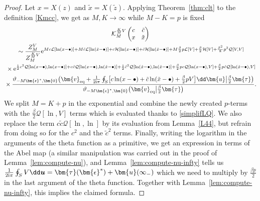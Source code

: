 \documentclass[pdftex]{sigma}
\numberwithin{equation}{section}
\begin{document}
\begin{proof}
Let $x = X(z)$ and $\tilde{x} = X(\tilde{z})$. Applying
 Theorem~\ref{thm:clt} to the definition \eqref{Kmcc}, we get as $M,K \rightarrow \infty$ while $ M - K = p$ is fixed
 \begin{gather*}
	 \mathcal{K}^{\frac{K}{M}V}_{M}\left(\begin{matrix} c & \tilde{c} \\ x & \tilde{x} \end{matrix}\right) \\
{} \sim \frac{Z^{V}_{M}}{Z^{\frac{K}{M}V}_{M}}{\rm e}^{Mc\mathcal{L}[\ln(x - \bullet)] + M\tilde{c}\mathcal{L}[\ln(\tilde{x} - \bullet)] + c\mathcal{H}[\ln(x - \bullet)] + \tilde{c}\mathcal{H}[\ln(\tilde{x} - \bullet)] + M\frac{\beta}{2}p\mathcal{L}[V] + \frac{\beta}{2}\mathcal{H}[V] + \frac{\beta^2}{8}p^2\mathcal{Q}[V,V]} \\
 {}\times{\rm e}^{ \frac{1}{2}c^2 \mathcal{Q}[\ln(x - \bullet),\ln(x - \bullet)] + c \tilde{c} \mathcal{Q}[\ln(x - \bullet),\ln(\tilde{x} - \bullet)] + \frac{1}{2}\tilde{c}^2\mathcal{Q}[\ln(\tilde{x} - \bullet),\ln(\tilde{x} - \bullet)]+\frac{\beta}{2}pc \mathcal{Q}[\ln(x - \bullet),V] + \frac{\beta}{2}p\tilde{c}\mathcal{Q}[\ln(\tilde{x} - \bullet),V]}\! \\
 {}\times \frac{\vartheta_{-M\bm{\epsilon}^{*}, \bm{0}}\bigl(\bm{v}_{{\rm eq}} + \frac{1}{2{\rm i}\pi} \oint_{S}\bigl[c\ln(x - \bullet) + \tilde{c}\ln(\tilde{x} - \bullet) + \frac{\beta}{2}p V\bigr] \dd \bm{u} \big| \frac{\beta}{2}\bm{\tau}\bigr)}{\vartheta_{-M\bm{\epsilon}^{*},\bm{0}}\bigl(\bm{v}_{{\rm eq}}\big|\frac{\beta}{2}\bm{\tau}\bigr)}.
\end{gather*}
We split $M = K + p$ in the exponential and combine the newly created
$p$-terms with the $\frac{\beta}{2}\mathcal{Q}[\ln,V]$ terms which is
evaluated thanks to \eqref{simplifLQ}. We also replace the term
$c\tilde{c}\mathcal{Q}[\ln,\ln]$ by its evaluation from
Lemma~\ref{L44}, but refrain from doing so for the $c^2$ and the
$\tilde{c}^2$ terms. Finally, writing the logarithm in the arguments of the
theta function as a primitive, we get an expression in terms of the
Abel map (a similar manipulation was carried out in the proof of Lemma~\ref{lem:compute-nu}), and Lemma~\ref{lem:compute-nu-infty} tells us $\frac{1}{2{\rm i}\pi} \oint_{S} V \dd \boldsymbol{u} = \bm{\tau}(\bm{\epsilon}^*) + \bm{u}(\infty_-)$ which we need to multiply by $\frac{\beta p}{2}$ in the last argument of the theta function. Together with Lemma~\ref{lem:compute-nu-infty},
this implies the claimed formula.
\end{proof}
\end{document}

